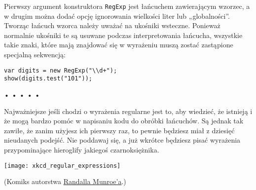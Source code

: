  
Pierwszy argument konstruktora \texttt{RegExp} jest łańcuchem zawierającym wzorzec, a w drugim można dodać opcję ignorowania wielkości liter lub „globalności”. Tworząc łańcuch wzorca należy uważać na ukośniki wsteczne. Ponieważ normalnie ukośniki te są usuwane podczas interpretowania łańcucha, wszystkie takie znaki, które mają znajdować się w wyrażeniu muszą zostać zastąpione specjalną sekwencją:

  
\begin{verbatim} 
var digits = new RegExp("\\d+");
show(digits.test("101"));
\end{verbatim}


\begin{center}
• • • • •
\end{center}

  
Najważniejsze jeśli chodzi o wyrażenia regularne jest to, aby wiedzieć, że istnieją i że mogą bardzo pomóc w napisaniu kodu do obróbki łańcuchów. Są jednak tak zawiłe, że zanim użyjesz ich pierwszy raz, to pewnie będziesz miał z dziesięć nieudanych podejść. Nie poddawaj się, a już wkrótce będziesz pisać wyrażenia przypominające hieroglify jakiegoś czarnoksiężnika.

\bigskip 
\centerline{\texttt{[image: xkcd\_regular\_expressions]}} 
\smallskip
  
(Komiks autorstwa \href{http://xkcd.com}{Randalla Munroe’a}.)
